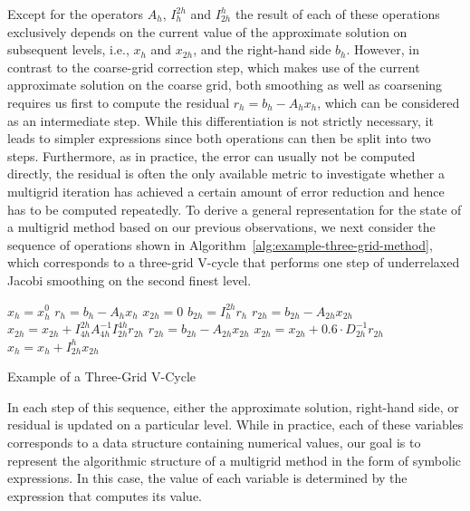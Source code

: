 Except for the operators $A_h$, $I_h^{2h}$ and $I_{2h}^h$ the result of each of these operations exclusively depends on the current value of the approximate solution on subsequent levels, i.e., $x_{h}$ and $x_{2h}$, and the right-hand side $b_h$.
However, in contrast to the coarse-grid correction step, which makes use of the current approximate solution on the coarse grid, both smoothing as well as coarsening requires us first to compute the residual $r_h = b_h - A_h x_h$, which can be considered as an intermediate step.
While this differentiation is not strictly necessary, it leads to simpler expressions since both operations can then be split into two steps.
Furthermore, as in practice, the error can usually not be computed directly, the residual is often the only available metric to investigate whether a multigrid iteration has achieved a certain amount of error reduction and hence has to be computed repeatedly.
To derive a general representation for the state of a multigrid method based on our previous observations, we next consider the sequence of operations shown in Algorithm~\ref{alg:example-three-grid-method}, which corresponds to a three-grid V-cycle that performs one step of underrelaxed Jacobi smoothing on the second finest level.
\begin{algorithm}[t]
	\begin{algorithmic}[1]
		\State $x_{h} = x_{h}^{0}$
		\State $r_{h} = b_{h} - A_h x_{h} $
		\State $ x_{2h} = 0$
		\State $ b_{2h} = I_{h}^{2h} r_{h}$
		\State $ r_{2h} = b_{2h} - A_{2h} x_{2h}$
		\State $ x_{2h} = x_{2h} + I_{4h}^{2h} A_{4h}^{-1} I_{2h}^{4h} r_{2h}$
		\State $ r_{2h} = b_{2h} - A_{2h} x_{2h}$
		\State $ x_{2h} = x_{2h} + 0.6 \cdot D_{2h}^{-1} r_{2h}$
		\State $x_{h} = x_{h}  + I_{2h}^h x_{2h}$
	\end{algorithmic}
\caption{Example of a Three-Grid V-Cycle}
\label{alg:example-three-grid-method}
\end{algorithm}
In each step of this sequence, either the approximate solution, right-hand side, or residual is updated on a particular level.
While in practice, each of these variables corresponds to a data structure containing numerical values, our goal is to represent the algorithmic structure of a multigrid method in the form of symbolic expressions.
In this case, the value of each variable is determined by the expression that computes its value.
